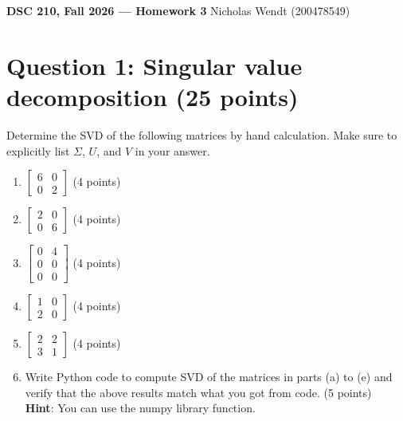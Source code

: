 \documentclass[11pt]{article}
\begin{document}
\textbf{DSC 210, Fall 2026 --- Homework 3} \hfill Nicholas Wendt (200478549)

\section*{Question 1: Singular value decomposition (25 points)}

Determine the SVD of the following matrices by hand calculation. Make sure to explicitly list $\Sigma$, $U$, and $V$ in your answer.
\begin{enumerate}
    \item[(a)] $\begin{bmatrix}
    6 & 0 \\ 0 & 2
    \end{bmatrix}$ (4 points)
    \item[(b)] $\begin{bmatrix}
    2 & 0 \\ 0 & 6
    \end{bmatrix}$ (4 points)
    \item[(c)] $\begin{bmatrix}
    0 & 4 \\ 0 & 0 \\ 0 & 0
    \end{bmatrix}$ (4 points)
    \item[(d)] $\begin{bmatrix}
    1 & 0 \\ 2 & 0
    \end{bmatrix}$ (4 points)
    \item[(e)] $\begin{bmatrix}
    2 & 2 \\ 3 & 1
    \end{bmatrix}$ (4 points)
    \item[(f)] Write Python code to compute SVD of the matrices in parts (a) to (e) and verify that the above results match what you got from code. (5 points)\\
    \textbf{Hint}: You can use the numpy library function.
\end{enumerate}
\end{document}

